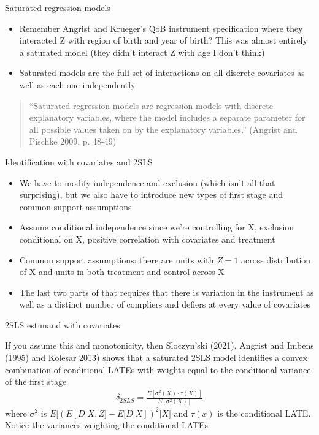 \documentclass{beamer}
\begin{document}
\begin{frame}{Saturated regression models}

\begin{itemize}
\item Remember Angrist and Krueger's QoB instrument specification where they interacted Z with region of birth and year of birth?  This was almost entirely a saturated model (they didn't interact Z with age I don't think)
\item Saturated models are the full set of interactions on all discrete covariates as well as each one independently 
\end{itemize}

\bigskip

\begin{quote}
``Saturated regression models are regression models with discrete explanatory variables, where the model includes a separate parameter for all possible values taken on by the explanatory variables.'' (Angrist and Pischke 2009, p. 48-49)
\end{quote}

\end{frame}


\begin{frame}{Identification with covariates and 2SLS}

\begin{itemize}
\item We have to modify independence and exclusion (which isn't all that surprising), but we also have to introduce new types of first stage and common support assumptions
\item Assume conditional independence since we're controlling for X, exclusion conditional on X, positive correlation with covariates and treatment
\item Common support assumptions: there are units with $Z=1$ across distribution of X and units in both treatment and control across X 
\item The last two parts of that requires that there is variation in the instrument as well as a distinct number of compliers and defiers at every value of covariates
\end{itemize}

\end{frame}

\begin{frame}{2SLS estimand with covariates}

If you assume this and monotonicity, then Sloczyn'ski (2021),  Angrist and Imbens (1995) and Kolesar 2013) shows that a saturated 2SLS model identifies a convex combination of conditional LATEs with weights equal to the conditional variance of the first stage
\begin{eqnarray*}
\delta_{2SLS} = \frac{E[\sigma^2(X) \cdot \tau(X) ]}{E[\sigma^2(X)]}
\end{eqnarray*}where $\sigma^2$ is $E \bigg [ (E[D|X,Z] - E[D|X] )^2 | X \bigg ]$ and $\tau(x)$ is the conditional LATE.  Notice the variances weighting the conditional LATEs

\end{frame}
\end{document}

